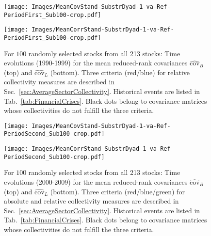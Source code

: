 \documentclass[aps, pra, groupedaddress, showkeys, twocolumn, floatfix, 10pt]{revtex4-2}
\newcommand*\meanNONDiag[1]{\widehat{#1}}
\begin{document}
%
\begin{figure*}[!htb]
	\centering
	\begin{minipage}{1.0\textwidth}
		\subfloat%
		{\texttt{[image: Images/MeanCovStand-SubstrDyad-1-va-Ref-PeriodFirst\_Sub100-crop.pdf]}
		}\par
		\subfloat%
		{\texttt{[image: Images/MeanCorrStand-SubstrDyad-1-va-Ref-PeriodFirst\_Sub100-crop.pdf]}
		}%
	\end{minipage}%
	\caption{\label{subfig:Main:MeanValCovP1_Sub100}For $100$ randomly selected stocks from all 213 stocks: Time evolutions (1990-1999) for the mean reduced-rank covariances $\meanNONDiag{\text{cov}}_{{B}}$ (top) and $\meanNONDiag{\text{cov}}_{{L}}$ (bottom).
		Three criteria (red/blue) for relative collectivity measures are described in Sec.~\ref{sec:AverageSectorCollectivity}. Historical events are listed in Tab.~\ref{tab:FinancialCrises}. Black dots belong to covariance matrices whose collectivities do not fulfill the three criteria.}
\end{figure*}
%


%
\begin{figure*}[!htb]
	\centering
	\begin{minipage}{1.0\textwidth}
		\subfloat%
		{\texttt{[image: Images/MeanCovStand-SubstrDyad-1-va-Ref-PeriodSecond\_Sub100-crop.pdf]}
		}\par
		\subfloat%
		{\texttt{[image: Images/MeanCorrStand-SubstrDyad-1-va-Ref-PeriodSecond\_Sub100-crop.pdf]}
		}%
	\end{minipage}%
	\caption{\label{subfig:Main:MeanValCovP2_Sub100}For $100$ randomly selected stocks from all 213 stocks: Time evolutions (2000-2009) for the mean reduced-rank covariances $\meanNONDiag{\text{cov}}_{{B}}$ (top) and $\meanNONDiag{\text{cov}}_{{L}}$ (bottom).
		Three criteria (red/blue/green) for absolute and relative collectivity measures are described in Sec.~\ref{sec:AverageSectorCollectivity}. Historical events are listed in Tab.~\ref{tab:FinancialCrises}. Black dots belong to covariance matrices whose collectivities do not fulfill the three criteria.}
\end{figure*}
%
\end{document}
